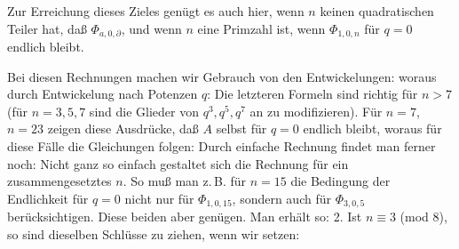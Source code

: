 Zur Erreichung dieses Zieles gen\"ugt es auch hier, wenn $n$ keinen quadratischen Teiler hat, da\ss{} $\Phi_{a,0,\partial}$, und wenn $n$ eine Primzahl ist, wenn $\Phi_{1,0,n}$ f\"ur $q=0$ endlich bleibt.

Bei diesen Rechnungen machen wir Gebrauch von den Entwickelungen:
woraus durch Entwickelung nach Potenzen $q$:
Die letzteren Formeln sind richtig f\"ur $n>7$ (f\"ur $n=3,5,7$ sind die Glieder von $q^3, q^5, q^7$ an zu modifizieren). F\"ur $n=7$, $n=23$ zeigen diese Ausdr\"ucke, da\ss{} $A$ selbst f\"ur $q=0$ endlich bleibt, woraus f\"ur diese F\"alle die Gleichungen folgen:
Durch einfache Rechnung findet man ferner noch:
Nicht ganz so einfach gestaltet sich die Rechnung f\"ur ein zusammengesetztes $n$. So mu\ss{} man z.\,B. f\"ur $n=15$ die Bedingung der Endlichkeit f\"ur $q=0$ nicht nur f\"ur $\Phi_{1,0,15}$, sondern auch f\"ur $\Phi_{3,0,5}$ ber\"ucksichtigen. Diese beiden aber gen\"ugen. Man erh\"alt so:
2. Ist $n \equiv 3$ (mod 8), so sind dieselben Schl\"usse zu ziehen, wenn wir setzen:

